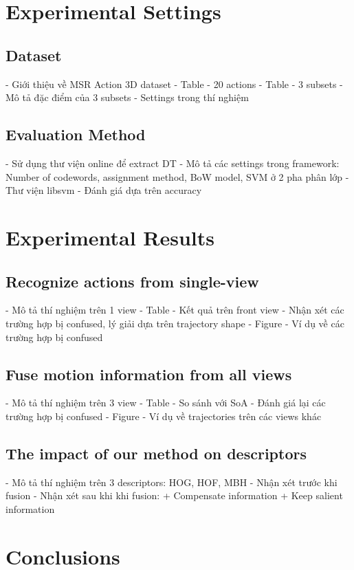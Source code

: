 \documentclass[review]{elsarticle}
\begin{document}
\section{Experimental Settings}

\subsection{Dataset}
- Giới thiệu về MSR Action 3D dataset
- Table - 20 actions
- Table - 3 subsets
- Mô tả đặc điểm của 3 subsets
- Settings trong thí nghiệm

\subsection{Evaluation Method}
- Sử dụng thư viện online để extract DT
- Mô tả các settings trong framework: Number of codewords, assignment method, BoW model, SVM ở 2 pha phân lớp
- Thư viện libsvm
- Đánh giá dựa trên accuracy

\section{Experimental Results}

\subsection{Recognize actions from single-view}
- Mô tả thí nghiệm trên 1 view
- Table - Kết quả trên front view
- Nhận xét các trường hợp bị confused, lý giải dựa trên trajectory shape
- Figure - Ví dụ về các trường hợp bị confused

\subsection{Fuse motion information from all views}
- Mô tả thí nghiệm trên 3 view
- Table - So sánh với SoA
- Đánh giá lại các trường hợp bị confused
- Figure - Ví dụ về trajectories trên các views khác

\subsection{The impact of our method on descriptors}
- Mô tả thí nghiệm trên 3 descriptors: HOG, HOF, MBH
- Nhận xét trước khi fusion
- Nhận xét sau khi khi fusion:
    + Compensate information
    + Keep salient information

\section{Conclusions}
\end{document}
